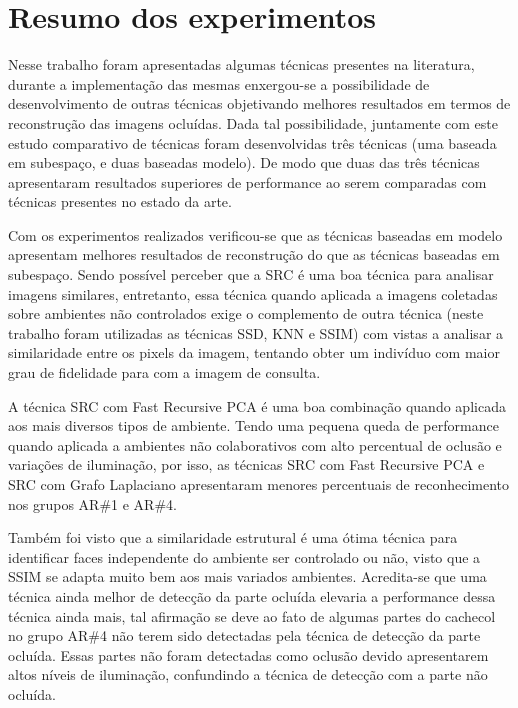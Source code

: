 \section{Resumo dos experimentos}

Nesse trabalho foram apresentadas algumas técnicas presentes na literatura, durante a implementação das mesmas enxergou-se a possibilidade de desenvolvimento de outras técnicas objetivando melhores resultados em termos de reconstrução das imagens ocluídas. Dada tal possibilidade, juntamente com este estudo comparativo de técnicas foram desenvolvidas três técnicas (uma baseada em subespaço, e duas baseadas modelo). De modo que duas das três técnicas apresentaram resultados superiores de performance ao serem comparadas com técnicas presentes no estado da arte.

Com os experimentos realizados verificou-se que as técnicas baseadas em modelo apresentam melhores resultados de reconstrução do que as técnicas baseadas em subespaço. Sendo possível perceber que a SRC é uma boa técnica para analisar imagens similares, entretanto, essa técnica quando aplicada a imagens coletadas sobre ambientes não controlados exige o complemento de outra técnica (neste trabalho foram utilizadas as técnicas SSD, KNN e SSIM) com vistas a analisar a similaridade entre os pixels da imagem, tentando obter um indivíduo com maior grau de fidelidade para com a imagem de consulta.

A técnica SRC com Fast Recursive PCA é uma boa combinação quando aplicada aos mais diversos tipos de ambiente. Tendo uma pequena queda de performance quando aplicada a ambientes não colaborativos com alto percentual de oclusão e variações de iluminação, por isso, as técnicas SRC com Fast Recursive PCA e SRC com Grafo Laplaciano apresentaram menores percentuais de reconhecimento nos grupos AR\#1 e AR\#4.


Também foi visto que a similaridade estrutural é uma ótima técnica para identificar faces independente do ambiente ser controlado ou não, visto que a SSIM se adapta muito bem aos mais variados ambientes. Acredita-se que uma técnica ainda melhor de detecção da parte ocluída elevaria a performance dessa técnica ainda mais, tal afirmação se deve ao fato de algumas partes do cachecol no grupo AR\#4 não terem sido detectadas pela técnica de detecção da parte ocluída. Essas partes não foram detectadas como oclusão devido apresentarem altos níveis de iluminação, confundindo a técnica de detecção com a parte não ocluída.




